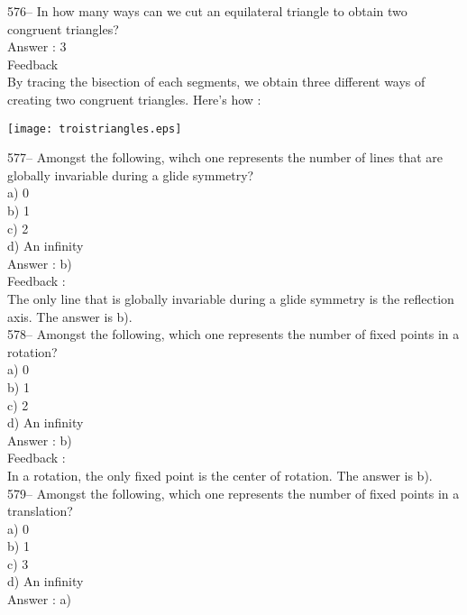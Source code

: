 \documentclass[letterpaper, 12pt]{article}
\begin{document}
576-- In how many ways can we cut an equilateral triangle to obtain two congruent triangles?\\

Answer : 3\\

Feedback\\
By tracing the bisection of each segments, we obtain three different ways of creating two congruent triangles. Here's how :\\
    \begin{center}
    \texttt{[image: troistriangles.eps]}
    \end{center}


577-- Amongst the following, wihch one represents the number of lines that are globally invariable during a glide symmetry?\\
a) 0\\
b) 1\\
c) 2\\
d) An infinity\\

Answer : b)\\

Feedback : \\
The only line that is globally invariable during a glide symmetry is the reflection axis. The answer is b).\\

578-- Amongst the following, which one represents the number of fixed points in a rotation?\\
a) 0\\
b) 1\\
c) 2\\
d) An infinity\\

Answer : b)\\

Feedback : \\
In a rotation, the only fixed point is the center of rotation. The answer is b).\\

579-- Amongst the following, which one represents the number of fixed points in a translation?\\
a) 0 \\
b) 1\\
c) 3\\
d) An infinity\\

Answer : a)\\
\end{document}
